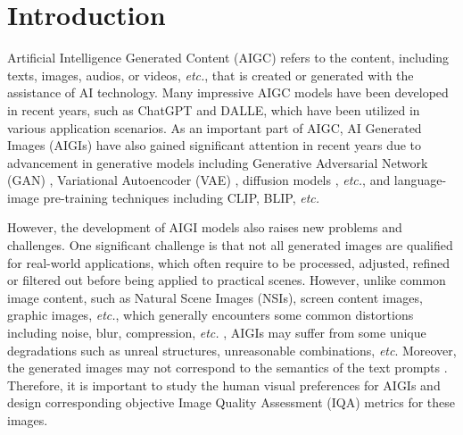 \documentclass[runningheads]{llncs}
\begin{document}
%
%
\section{Introduction}
Artificial Intelligence Generated Content (AIGC) refers to the content, including texts, images, audios, or videos, \textit{etc.}, that is created or generated with the assistance of AI technology.
Many impressive AIGC models have been developed in recent years, such as ChatGPT %
and DALLE\cite{ramesh2022hierarchical}, which have been utilized in various application scenarios. 
As an important part of AIGC, AI Generated Images (AIGIs) have also gained significant attention in recent years due to advancement in generative models including Generative Adversarial Network (GAN) \cite{goodfellow2020generative}, Variational Autoencoder (VAE) \cite{kingma2013auto}, diffusion models \cite{Rombach2021HighResolutionIS}, \textit{etc.}, and language-image pre-training techniques including CLIP\cite{radford2021learning}, BLIP\cite{li2022blip}, \textit{etc.}

However, the development of AIGI models also raises new problems and challenges. 
One significant challenge is that not all generated images are qualified for real-world applications, which often require to be processed, adjusted, refined or filtered out before being applied to practical scenes.
However, unlike common image content, such as Natural Scene Images (NSIs)\cite{duan2017ivqad,duan2018perceptual}, screen content images\cite{min2017unified,duan2022confusing}, graphic images\cite{min2017unified,duan2022saliency}, \textit{etc.}, which generally encounters some common distortions including  noise, blur, compression, \emph{etc.} \cite{duan2023masked,duan2022develop}, AIGIs may suffer from some unique degradations such as unreal structures, unreasonable combinations, \textit{etc}. Moreover, the generated images may not correspond to the semantics of the text prompts \cite{lee2023aligning,kirstain2023pick,xu2023imagereward}.
Therefore, it is important to study the human visual preferences for AIGIs and design corresponding objective Image Quality Assessment (IQA) metrics for these images.
\end{document}
